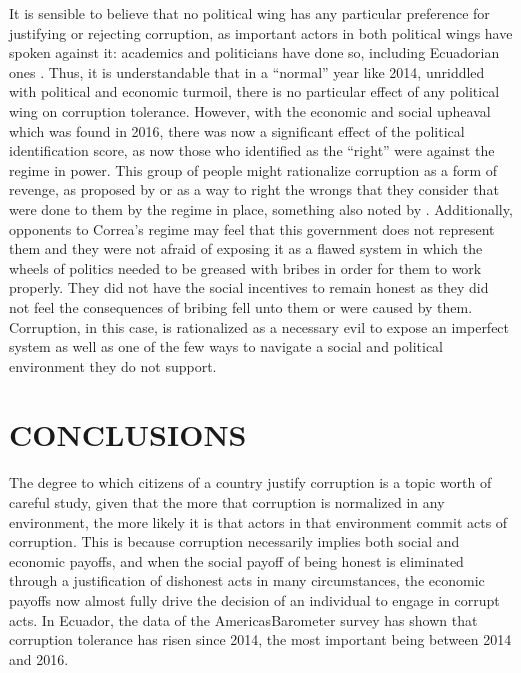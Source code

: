 \documentclass[floatsintext,man]{apa7}\usepackage[]{graphicx}\usepackage[]{color}
\begin{document}
It is sensible to believe that no political wing has any particular preference for justifying or rejecting corruption, as important actors in both political wings have spoken against it: academics \parencite{Holcombe.2015} and politicians \parencite{Morris.2021} have done so, including Ecuadorian ones \parencite{Miguel.2021}. Thus, it is understandable that in a \enquote{normal} year like 2014, unriddled with political and economic turmoil, there is no particular effect of any political wing on corruption tolerance. However, with the economic and social upheaval which was found in 2016, there was now a significant effect of the political identification score, as now those who identified as the \enquote{right} were against the regime in power. This group of people might rationalize corruption as a form of revenge, as proposed by \textcite{Ashforth.2003} or as a way to right the wrongs that they consider that were done to them by the regime in place, something also noted by \textcite{Adoum.2000}. Additionally, opponents to Correa's regime may feel that this government does not represent them and they were not afraid of exposing it as a flawed system in which the wheels of politics needed to be greased with bribes in order for them to work properly. They did not have the social incentives to remain honest as they did not feel the consequences of bribing fell unto them or were caused by them. Corruption, in this case, is rationalized as a necessary evil to expose an imperfect system as well as one of the few ways to navigate a social and political environment they do not support.




\clearpage


\section{CONCLUSIONS}

The degree to which citizens of a country justify corruption is a topic worth of careful study, given that the more that corruption is normalized in any environment, the more likely it is that actors in that environment commit acts of corruption. This is because corruption necessarily implies both social and economic payoffs, and when the social payoff of being honest is eliminated through a justification of dishonest acts in many circumstances, the economic payoffs now almost fully drive the decision of an individual to engage in corrupt acts. In Ecuador, the data of the AmericasBarometer survey has shown that corruption tolerance has risen since 2014, the most important being between 2014 and 2016.
\end{document}
